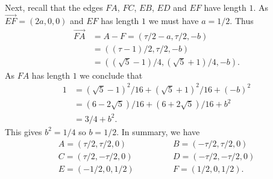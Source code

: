 \documentclass{amsart}
\renewcommand{\:}{\colon}
\theoremstyle{definition}
\begin{document}
Next, recall that the edges $FA$, $FC$, $EB$, $ED$ and $EF$ have
length $1$.  As $\vec{EF}=(2a,0,0)$ and $EF$ has length $1$ we must
have $a=1/2$.  Thus
\begin{align*}
 \vec{FA} &= A-F =(\tau/2-a,\tau/2,-b) \\
          &= ((\tau-1)/2,\tau/2,-b) \\
          &= ((\sqrt{5}-1)/4,(\sqrt{5}+1)/4,-b).
\end{align*}
As $FA$ has length $1$ we conclude that
\begin{align*}
 1 &= (\sqrt{5}-1)^2/16 + (\sqrt{5}+1)^2/16 + (-b)^2 \\
   &= (6-2\sqrt{5})/16 + (6+2\sqrt{5})/16 + b^2 \\
   &= 3/4 + b^2.
\end{align*}
This gives $b^2=1/4$ so $b=1/2$.  In summary, we have
\[ \begin{array}{lll}
    A = ( \tau/2, \tau/2,0) &\hspace{3em}& B = (-\tau/2, \tau/2,0) \\
    C = ( \tau/2,-\tau/2,0) &\hspace{3em}& D = (-\tau/2,-\tau/2,0) \\
    E = ( -1/2, 0, 1/2)     &\hspace{3em}& F = (1/2,0,1/2).
\end{array} \]
\end{document}
